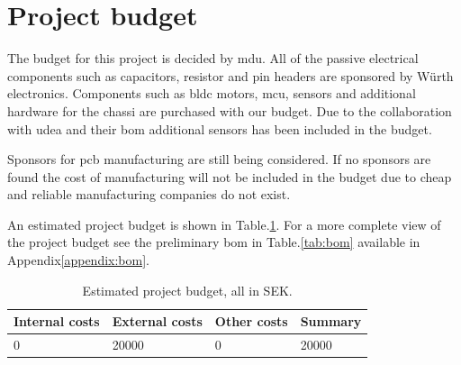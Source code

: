 \section{Project budget}
The budget for this project is decided by \ac{mdu}. All of the passive electrical components such as capacitors, resistor and pin headers are sponsored by Würth electronics. Components such as \ac{bldc} motors, \ac{mcu}, sensors and additional hardware for the chassi are purchased with our budget. Due to the collaboration with \ac{udea} and their \ac{bom} additional sensors has been included in the budget.

Sponsors for \ac{pcb} manufacturing are still being considered. If no sponsors are found the cost of manufacturing will not be included in the budget due to cheap and reliable manufacturing companies do not exist.

An estimated project budget is shown in Table.\:\ref{tab:estimated_budget}. For a more complete view of the project budget see the preliminary \ac{bom} in Table.\:\ref{tab:bom} available in Appendix\:\ref{appendix:bom}.
\label{section:project_budget}

\begin{table}[H]
    \caption{Estimated project budget, all in SEK.}
    \label{tab:estimated_budget}
    \begin{tabularx}{\columnwidth}{|X|X|X|X|}
        \hline
        Internal costs & External costs & Other costs & Summary \\ \hline
        0              & 20000           & 0           & 20000    \\ \hline
    \end{tabularx}
\end{table}

